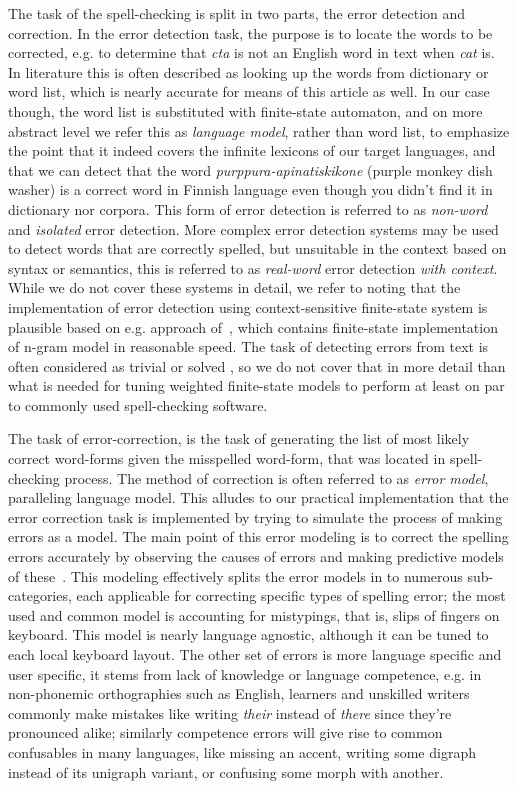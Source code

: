 \documentclass[a4paper,12pt]{article}
\begin{document}
The task of the spell-checking is split in two parts, the error detection and
correction. In the error detection task, the purpose is to locate the words to
be corrected, e.g. to determine that \emph{cta} is not an English word in text
when \emph{cat} is. In literature this is often described as looking up the
words from dictionary or word list, which is nearly accurate for means of this
article as well. In our case though, the word list is substituted with
finite-state automaton, and on more abstract level we refer this as
\emph{language model}, rather than word list, to emphasize the point that it
indeed covers the infinite lexicons of our target languages, and that we can
detect that the word \emph{purppura-apinatiskikone} (purple monkey dish washer)
is a correct word in Finnish language even though you didn't find it in
dictionary nor corpora.  This form of error detection is referred to as
\emph{non-word} and \emph{isolated} error detection. More complex error
detection systems may be used to detect words that are correctly spelled, but
unsuitable in the context based on syntax or semantics, this is referred to as
\emph{real-word} error detection \emph{with context}. While we do not cover
these systems in detail, we refer to \cite{mays/1991} noting that the
implementation of error detection using context-sensitive finite-state system
is plausible based on e.g. approach of~\cite{silfverberg/2010}, which contains
finite-state implementation of n-gram model in reasonable speed. The task of
detecting errors from text is often considered as trivial or solved
\cite[e.g.][]{otero/2007}, so we do not cover that in more detail than what is
needed for tuning weighted finite-state models to perform at least on par to
commonly used spell-checking software.

The task of error-correction, is the task of generating the list of most likely
correct word-forms given the misspelled word-form, that was located in
spell-checking process. The method of correction is often referred to as
\emph{error model}, paralleling language model. This alludes to our practical
implementation that the error correction task is implemented by trying to
simulate the process of making errors as a model. The main point of this error
modeling is to correct the spelling errors accurately by observing the causes
of errors and making predictive models of these~\cite{deorowicz2005correcting}.
This modeling effectively splits the error models in to numerous
sub-categories, each applicable for correcting specific types of spelling
error; the most used and common model is accounting for mistypings, that is,
slips of fingers on keyboard. This model is nearly language agnostic, although
it can be tuned to each local keyboard layout. The other set of errors is more
language specific and user specific, it stems from lack of knowledge or
language competence, e.g.  in non-phonemic orthographies such as English,
learners and unskilled writers commonly make mistakes like writing \emph{their}
instead of \emph{there} since they're pronounced alike; similarly competence
errors will give rise to common confusables in many languages, like missing an
accent, writing some digraph instead of its unigraph variant, or confusing some
morph with another.
\end{document}
